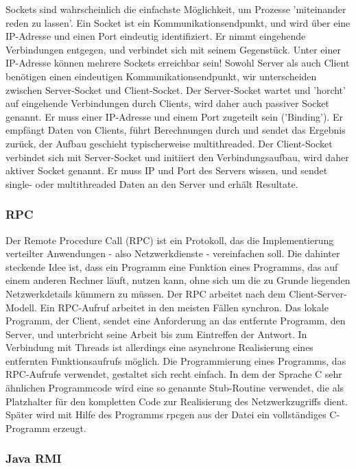 \documentclass[letterpaper, 12pt]{article}
\let\tempsubsubsection\subsubsection
\renewcommand\subsubsection[1]{\vspace{0cm}\tempsubsubsection{#1}\vspace{0cm}}
\begin{document}
Sockets sind wahrscheinlich die einfachste Möglichkeit, um Prozesse 'miteinander reden zu lassen'. Ein Socket ist ein Kommunikationsendpunkt, und wird über eine IP-Adresse und einen Port eindeutig identifiziert. Er nimmt eingehende Verbindungen entgegen, und verbindet sich mit seinem Gegenstück. Unter einer IP-Adresse können mehrere Sockets erreichbar sein! Sowohl Server als auch Client
benötigen einen eindeutigen Kommunikationsendpunkt, wir unterscheiden zwischen
Server-Socket und Client-Socket. Der Server-Socket wartet und 'horcht' auf eingehende
Verbindungen durch Clients, wird daher auch passiver Socket genannt. Er muss einer IP-Adresse und einem Port zugeteilt sein ('Binding'). Er empfängt Daten von Clients, führt Berechnungen
durch und sendet das Ergebnis zurück, der Aufbau geschieht typischerweise multithreaded. Der Client-Socket verbindet sich mit Server-Socket und initiiert den Verbindungsaufbau, wird daher aktiver Socket genannt. Er muss IP und Port des Servers wissen, und sendet single- oder multithreaded Daten an den Server und erhält Resultate. \cite{socketslides}

\subsubsection{RPC}

Der Remote Procedure Call (RPC) ist ein Protokoll, das die Implementierung verteilter Anwendungen - also Netzwerkdienste - vereinfachen soll. Die dahinter steckende Idee ist, dass ein Programm eine Funktion eines Programms, das auf einem anderen Rechner läuft, nutzen kann, ohne sich um die zu Grunde liegenden Netzwerkdetails kümmern zu müssen. Der RPC arbeitet nach dem Client-Server-Modell. Ein RPC-Aufruf arbeitet in den meisten Fällen synchron. Das lokale Programm, der Client, sendet eine Anforderung an das entfernte Programm, den Server, und unterbricht seine Arbeit bis zum Eintreffen der Antwort. In Verbindung mit Threads ist allerdings eine asynchrone Realisierung eines entfernten Funktionsaufrufs möglich. Die Programmierung eines Programms, das RPC-Aufrufe verwendet, gestaltet sich recht einfach. In dem der Sprache C sehr ähnlichen Programmcode wird eine so genannte Stub-Routine verwendet, die als Platzhalter für den kompletten Code zur Realisierung des Netzwerkzugriffs dient. Später wird mit Hilfe des Programms rpcgen aus der Datei ein vollständiges C-Programm erzeugt. \citep{rpc}

\subsubsection{Java RMI}
\end{document}
